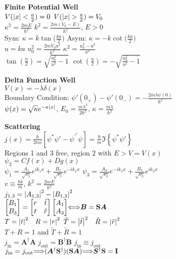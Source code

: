 \documentclass[11pt, a4paper]{article}
\newcommand{\newsec}[1]{\vspace{2mm}\textbf{#1}\\}
\renewcommand{\vec}[1]{\bm{#1}} %
\newcommand{\mat}[1]{\mathbf{#1}} %
\let\spaceyiff\iff
\renewcommand{\iff}{\hspace{-1mm}\spaceyiff\hspace{-1mm}}
\let\spaceyimplies\implies
\renewcommand{\implies}{\hspace{-1mm}\spaceyimplies\hspace{-1mm}}
\begin{document}
\begin{multicols}{2}
\newsec{Finite Potential Well}
$ V(\abs{x} < \frac{a}{2}) = 0 $ \qquad $ V(\abs{x} > \frac{a}{2}) = V_{0} $\\
$ \kappa^{2} = \frac{2mE}{\hbar^{2}} $ \qquad $ k^{2} = \frac{2m(V_{0} - E)}{\hbar^{2}} $, \quad $ E > 0 $\\
Sym: $ \kappa = k \tan \big(\frac{ka}{2}\big) $ \qquad Asym: $ \kappa = -k \cot \big(\frac{ka}{2}\big) $\\
$ u = ka $ \qquad $ u_{0}^{2} = \frac{2mV_{0}a^{2}}{\hbar^{2}} $ \qquad $ \kappa^{2} = \frac{u_{0}^{2} - u^{2}}{a^{2}} $\\
$ \tan(\frac{u}{2}) = \sqrt{\frac{u_{0}^{2}}{u^{2}} - 1} $ \qquad $ \cot(\frac{u}{2}) = -\sqrt{\frac{u_{0}^{2}}{u^{2}} - 1} $



\newsec{Delta Function Well}
$ V(x) = -\lambda \delta (x) $\\
Boundary Condition: $ \psi'(0_{+}) - \psi'(0_{-}) = -\frac{2m\lambda\psi(0)}{\hbar^{2}} $\\
$ \psi(x) = \sqrt{\kappa} e^{-\kappa \abs{x}} $, \quad $ E_{0} = \frac{m\lambda^{2}}{2\hbar^{2}} $, \quad $ \kappa = \frac{m\lambda}{\hbar^{2}} $


\newsec{Scattering}
$ j(x) = \frac{\hbar}{2mi}\left[\psi^{*}\psi' - \psi^{'^{*}}\psi\right] = \frac{\hbar}{m} \Im \left\{\psi^{*}\psi'\right\} $\\
Regions 1 and 3 free, region 2 with $ E > V = V(x) $\\
$ \psi_{2} = C f(x) + D g(x) $\\
$ \psi_{1} = \frac{A_{1}}{\sqrt{v_{1}}} e^{ik_{1}x} + \frac{B_{1}}{\sqrt{v_{1}}}e^{-ik_{1}x} $ \quad $ \psi_{3} = \frac{A_{3}}{\sqrt{v_{3}}} e^{-ik_{3}x} + \frac{B_{3}}{\sqrt{v_{3}}}e^{ik_{3}x} $\\


$ v \equiv \frac{\hbar k}{m} $, \qquad $ k^{2} = \frac{2mE}{\hbar^{2}} $\\
$  j_{1,3} = \abs{A_{1,3}}^{2} - \abs{B_{1,3}}^{2} $\\
$ \begin{bmatrix}
	B_{1}\\
	B_{3}
\end{bmatrix}
= 
\begin{bmatrix}
	r & \tilde{t}\\
	t & \tilde{r}
\end{bmatrix}
\begin{bmatrix}
	A_{1}\\
	A_{3}
\end{bmatrix}
\iff \vec{B} = \mat{S} \vec{A} $\\
$ 	T = \abs{t}^{2} \quad R = \abs{r}^{2} $ \qquad  $ \tilde{T} = \abs{\tilde{t}}^{2} \quad \tilde{R} = \abs{\tilde{r}}^{2} $\\
 $ T + R = 1 $ and $ \tilde{T} + \tilde{R} = 1 $ \\
$ j_{\text{in}} = \vec{A}^{\dagger}\vec{A} $ \qquad $ j_{\text{out}} = \vec{B}^{\dagger}\vec{B} $ \qquad  $ j_{\text{in}} \equiv j_{\text{out}} $ \\
  $ j_{\text{in}} = j_{\text{out}} \implies  (\vec{A}^{\dagger}\mat{S}^{\dagger})(\mat{S}\vec{A}) \implies \vec{S}^{\dagger}\mat{S} = \mat{I} $
 

\end{multicols}
\end{document}
